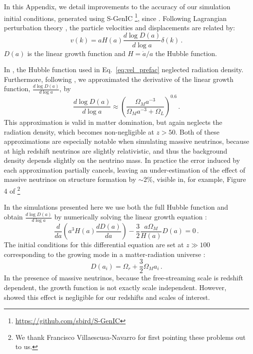 \documentclass[useAMS, usenatbib]{mnras}
\begin{document}
In this Appendix, we detail improvements to the accuracy of our simulation initial conditions, generated using S-GenIC \footnote{\url{https://github.com/sbird/S-GenIC}}, since \cite{AHB}.
Following Lagrangian perturbation theory \citep{Zeldovich_1970, Scoccimarro_1998}, 
the particle velocities and displacements are related by:
\begin{equation}
v(k) = a H(a) \frac{d \log D(a)}{d \log a} \delta(k)\,.
\label{eq:vel_prefac}
\end{equation}
$D(a)$ is the linear growth function and $H = \dot{a}/a$ the Hubble function.

In \cite{AHB}, the Hubble function used in Eq.~\ref{eq:vel_prefac}
neglected radiation density. Furthermore, following \cite{Bouchet:1995}, we 
approximated the derivative of the linear growth function, $\frac{d \log D(a)}{d \log a}$, by 
\begin{equation}
\frac{d \log D(a)}{d \log a} \approx \left(\frac{\Omega_M a^{-3}}{\Omega_M  a^{-3} + \Omega_L}\right)^{0.6}\,.
\end{equation}
This approximation is valid in matter domination, but again neglects the radiation density,
which becomes non-negligible at $z > 50$. Both of these approximations are especially notable
when simulating massive neutrinos, because at high redshift neutrinos are slightly relativistic,
and thus the background density depends slightly on the neutrino mass. In practice the error 
induced by each approximation partially cancels, leaving an under-estimation of the effect of 
massive neutrinos on structure formation by $\sim 2 \%$, visible in, for example, 
Figure 4 of \cite{AHB}\footnote{We thank Francisco Villaescusa-Navarro for first pointing these problems out to us.}

In the simulations presented here we use both the full Hubble function
and obtain $\frac{d \log D(a)}{d \log a}$ by numerically solving
the linear growth equation \citep{Peebles:1993}:
\begin{equation}
\frac{d}{da}\left(a^3 H(a) \frac{d D(a)}{da}\right) - \frac{3}{2} \frac{a \Omega_M}{H(a)} D(a) = 0\,.
\end{equation}
The initial conditions for this differential equation are set at $z \gg 100$ corresponding
to the growing mode in a matter-radiation universe \citep{Groth:1975}:
\begin{equation}
  D(a_i) = \Omega_r + \frac{3}{2} \Omega_M a_i\,.
\end{equation}
In the presence of massive neutrinos, because the free-streaming scale is redshift dependent, 
the growth function is not exactly scale independent. However, \cite{Zennaro_2017} showed this
effect is negligible for our redshifts and scales of interest.
\end{document}
